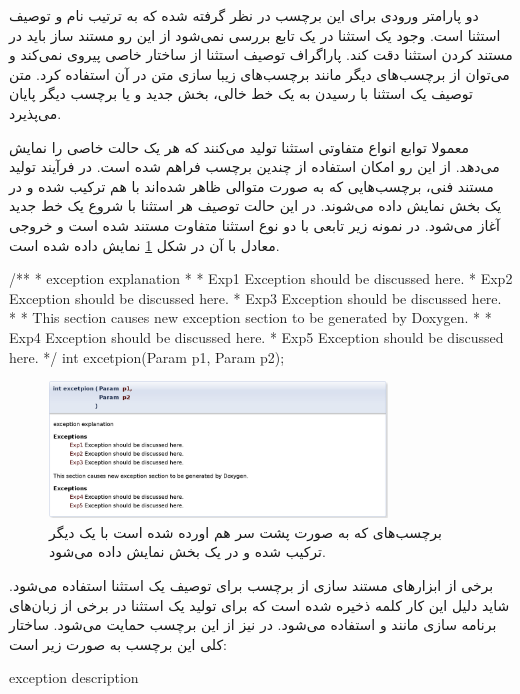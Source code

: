 دو پارامتر ورودی برای این برچسب در نظر گرفته شده که به ترتیب نام و توصیف استثنا
است.
وجود یک استثنا در یک تابع بررسی نمی‌شود از این رو مستند ساز باید در
مستند کردن استثنا دقت کند.
پاراگراف توصیف استثنا از ساختار خاصی پیروی نمی‌کند و می‌توان از برچسب‌های دیگر مانند
برچسب‌های زیبا سازی متن در آن استفاده کرد.
متن توصیف یک استثنا با رسیدن به یک خط خالی، بخش جدید و یا برچسب دیگر پایان می‌پذیرد.

معمولا توابع انواع متفاوتی استثنا تولید می‌کنند که هر یک حالت خاصی را نمایش می‌دهد.
از این رو امکان استفاده از چندین برچسب  فراهم شده است.
در فرآیند تولید مستند فنی، برچسب‌هایی که به صورت متوالی ظاهر شده‌اند با هم ترکیب
شده و در یک بخش نمایش داده می‌شوند.
در این حالت توصیف هر استثنا با شروع یک خط جدید آغاز می‌شود.
در نمونه زیر تابعی با دو نوع استثنا متفاوت مستند شده است و خروجی معادل با آن در شکل 
\ref{write/document-the-code/function/exception} نمایش داده شده است.
\begin{C++}
/**
 * \brief exception explanation
 *
 * \exception Exp1 Exception should be discussed here.
 * \exception Exp2 Exception should be discussed here.
 * \exception Exp3 Exception should be discussed here.
 *
 * This section causes new exception section to be generated by Doxygen.
 *
 * \exception Exp4 Exception should be discussed here.
 * \exception Exp5 Exception should be discussed here.
 */
int excetpion(Param p1, Param p2);
\end{C++} 
\begin{figure}
	\centering
	\includegraphics[width=0.8\textwidth]{image/write/document-the-code/function/exception}
	\caption[استثناهای یک تابع]{
		برچسب‌های  که به صورت پشت سر هم اورده شده است با یک دیگر ترکیب شده 
		و در یک بخش نمایش داده می‌شود.
	}
	\label{write/document-the-code/function/exception}
\end{figure}

برخی از ابزارهای مستند سازی از برچسب  برای توصیف یک استثنا استفاده می‌شود.
شاید دلیل این کار کلمه ذخیره شده  است که برای تولید یک استثنا در برخی
از زبان‌های برنامه سازی مانند  و  استفاده می‌شود.
در  نیز از این برچسب حمایت می‌شود.
ساختار کلی این برچسب به صورت زیر است:
\begin{C++}
 { exception description }
\end{C++}

